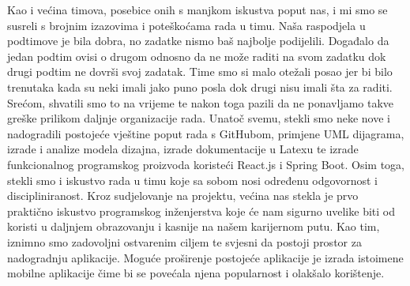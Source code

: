 		Kao i većina timova, posebice onih s manjkom iskustva poput nas, i mi smo se susreli s brojnim izazovima i poteškoćama rada u timu. Naša raspodjela u podtimove je bila dobra, no zadatke nismo baš najbolje podijelili. Događalo da jedan podtim ovisi o drugom odnosno da ne može raditi na svom zadatku dok drugi podtim ne dovrši svoj zadatak. Time smo si malo otežali posao jer bi bilo trenutaka kada su neki imali jako puno posla dok drugi nisu imali šta za raditi. Srećom, shvatili smo to na vrijeme te nakon toga pazili da ne ponavljamo takve greške prilikom daljnje organizacije rada. \newline
		Unatoč svemu, stekli smo neke nove i nadogradili postojeće vještine poput rada s GitHubom, primjene UML dijagrama, izrade i analize modela dizajna, izrade dokumentacije u Latexu te izrade funkcionalnog programskog proizvoda koristeći React.js i Spring Boot. Osim toga, stekli smo i iskustvo rada u timu koje sa sobom nosi određenu odgovornost i discipliniranost. Kroz sudjelovanje na projektu, većina nas stekla je prvo praktično iskustvo programskog inženjerstva koje će nam sigurno uvelike biti od koristi u daljnjem obrazovanju i kasnije na našem karijernom putu.
		Kao tim, iznimno smo zadovoljni ostvarenim ciljem te svjesni da postoji prostor za nadogradnju aplikacije. Moguće proširenje postojeće aplikacije je izrada istoimene mobilne aplikacije čime bi se povećala njena popularnost i olakšalo korištenje.
		 
		\eject 